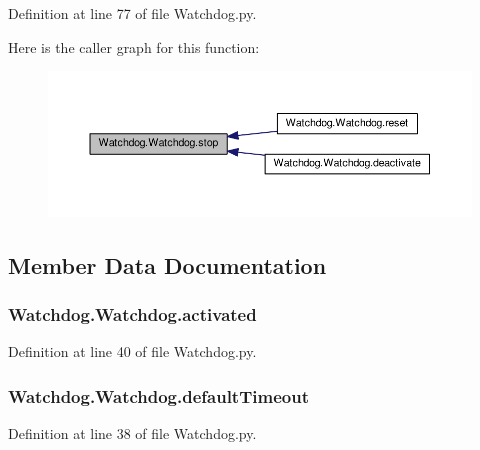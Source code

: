 Definition at line 77 of file Watchdog.\-py.



Here is the caller graph for this function\-:
\nopagebreak
\begin{figure}[H]
\begin{center}
\leavevmode
\includegraphics[width=350pt]{class_watchdog_1_1_watchdog_af56d743f19894122322a238de2bb36c7_icgraph}
\end{center}
\end{figure}




\subsection{Member Data Documentation}
\hypertarget{class_watchdog_1_1_watchdog_ab78c4b2339ad2efec784a3df0a5f37d6}{
\subsubsection[{activated}]{\setlength{\rightskip}{0pt plus 5cm}Watchdog.\-Watchdog.\-activated}}\label{class_watchdog_1_1_watchdog_ab78c4b2339ad2efec784a3df0a5f37d6}


Definition at line 40 of file Watchdog.\-py.

\hypertarget{class_watchdog_1_1_watchdog_a8e50eb419e58d250fc32011f33dfd6b7}{
\subsubsection[{default\-Timeout}]{\setlength{\rightskip}{0pt plus 5cm}Watchdog.\-Watchdog.\-default\-Timeout}}\label{class_watchdog_1_1_watchdog_a8e50eb419e58d250fc32011f33dfd6b7}


Definition at line 38 of file Watchdog.\-py.


